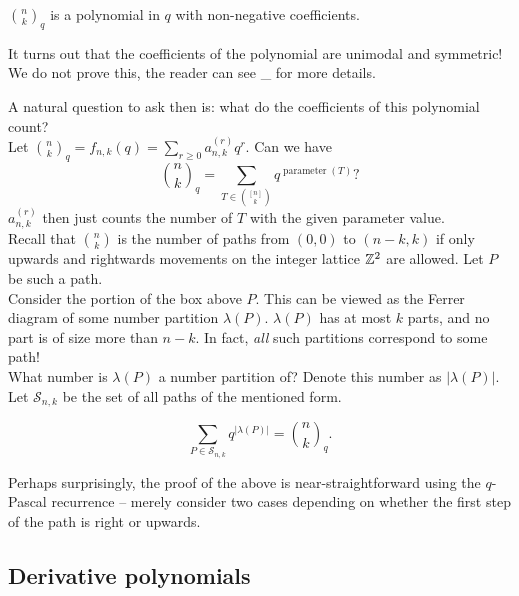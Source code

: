 	\begin{fcor}
		$\binom{n}{k}_q$ is a polynomial in $q$ with non-negative coefficients.
	\end{fcor}
	It turns out that the coefficients of the polynomial are unimodal and symmetric! We do not prove this, the reader can see \_ for more details.


	A natural question to ask then is: what do the coefficients of this polynomial count?\\
	Let $\binom{n}{k}_q = f_{n,k}(q) = \sum_{r \ge 0} a_{n,k}^{(r)} q^r$.
	Can we have
	\[ \binom{n}{k}_q = \sum_{T \in \binom{[n]}{k}} q^{\operatorname{parameter}(T)}? \]
	$a_{n,k}^{(r)}$ then just counts the number of $T$ with the given parameter value.\\
	Recall that $\binom{n}{k}$ is the number of paths from $(0,0)$ to $(n-k,k)$ if only upwards and rightwards movements on the integer lattice $\mathbb{Z}^2$ are allowed. Let $P$ be such a path.\\
	Consider the portion of the box above $P$. This can be viewed as the Ferrer diagram of some number partition $\lambda(P)$. $\lambda(P)$ has at most $k$ parts, and no part is of size more than $n-k$. In fact, \emph{all} such partitions correspond to some path!\\
	What number is $\lambda(P)$ a number partition of? Denote this number as $|\lambda(P)|$. Let $\mathcal{S}_{n,k}$ be the set of all paths of the mentioned form. 

	\begin{ftheo}
		\[ \sum_{P \in \mathcal{S}_{n,k}} q^{|\lambda(P)|} = \binom{n}{k}_q. \]
	\end{ftheo}
	Perhaps surprisingly, the proof of the above is near-straightforward using the $q$-Pascal recurrence -- merely consider two cases depending on whether the first step of the path is right or upwards.

\subsection{Derivative polynomials}

